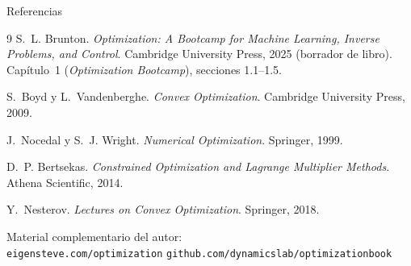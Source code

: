 \documentclass[10pt,aspectratio=169]{beamer}
\theoremstyle{definition}
\theoremstyle{plain}
\begin{document}
\begin{frame}[allowframebreaks]{Referencias}
  \small
  \begin{thebibliography}{9}
      S.~L. Brunton.
      \newblock \emph{Optimization: A Bootcamp for Machine Learning, Inverse
                Problems, and Control}.
      \newblock Cambridge University Press, 2025 (borrador de libro).
      \newblock Capítulo~1 (\emph{Optimization Bootcamp}), secciones
                1.1--1.5.

      S.~Boyd y L.~Vandenberghe.
      \newblock \emph{Convex Optimization}.
      \newblock Cambridge University Press, 2009.

      J.~Nocedal y S.~J. Wright.
      \newblock \emph{Numerical Optimization}.
      \newblock Springer, 1999.

      D.~P. Bertsekas.
      \newblock \emph{Constrained Optimization and Lagrange Multiplier Methods}.
      \newblock Athena Scientific, 2014.

      Y.~Nesterov.
      \newblock \emph{Lectures on Convex Optimization}.
      \newblock Springer, 2018.
  \end{thebibliography}

  \vspace{0.5em}
  Material complementario del autor: \\
  \texttt{eigensteve.com/optimization} \quad
  \texttt{github.com/dynamicslab/optimizationbook}
\end{frame}
\end{document}
